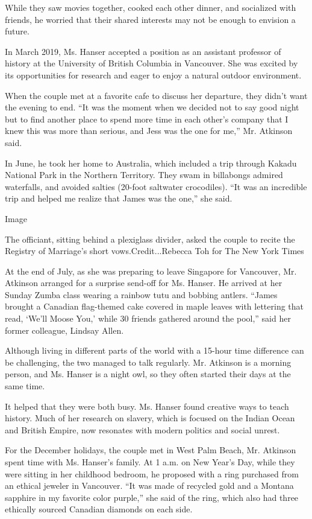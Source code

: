 While they saw movies together, cooked each other dinner, and socialized
with friends, he worried that their shared interests may not be enough
to envision a future.

In March 2019, Ms. Hanser accepted a position as an assistant professor
of history at the University of British Columbia in Vancouver. She was
excited by its opportunities for research and eager to enjoy a natural
outdoor environment.

When the couple met at a favorite cafe to discuss her departure, they
didn't want the evening to end. ``It was the moment when we decided not
to say good night but to find another place to spend more time in each
other's company that I knew this was more than serious, and Jess was the
one for me,'' Mr. Atkinson said.

In June, he took her home to Australia, which included a trip through
Kakadu National Park in the Northern Territory. They swam in billabongs
admired waterfalls, and avoided salties (20-foot saltwater crocodiles).
``It was an incredible trip and helped me realize that James was the
one,'' she said.

Image

The officiant, sitting behind a plexiglass divider, asked the couple to
recite the Registry of Marriage's short vows.Credit...Rebecca Toh for
The New York Times

At the end of July, as she was preparing to leave Singapore for
Vancouver, Mr. Atkinson arranged for a surprise send-off for Ms. Hanser.
He arrived at her Sunday Zumba class wearing a rainbow tutu and bobbing
antlers. ``James brought a Canadian flag-themed cake covered in maple
leaves with lettering that read, `We'll Moose You,' while 30 friends
gathered around the pool,'' said her former colleague, Lindsay Allen.

Although living in different parts of the world with a 15-hour time
difference can be challenging, the two managed to talk regularly. Mr.
Atkinson is a morning person, and Ms. Hanser is a night owl, so they
often started their days at the same time.

It helped that they were both busy. Ms. Hanser found creative ways to
teach history. Much of her research on slavery, which is focused on the
Indian Ocean and British Empire, now resonates with modern politics and
social unrest.

For the December holidays, the couple met in West Palm Beach, Mr.
Atkinson spent time with Ms. Hanser's family. At 1 a.m. on New Year's
Day, while they were sitting in her childhood bedroom, he proposed with
a ring purchased from an ethical jeweler in Vancouver. ``It was made of
recycled gold and a Montana sapphire in my favorite color purple,'' she
said of the ring, which also had three ethically sourced Canadian
diamonds on each side.


